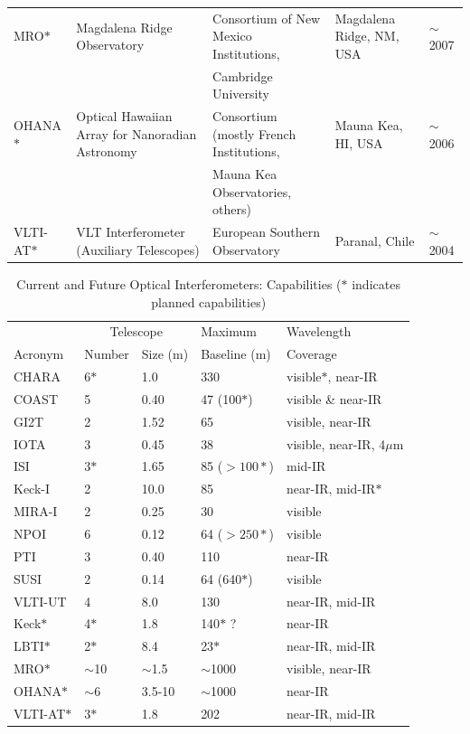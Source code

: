 \documentclass[12pt]{iopart}
\begin{document}
\begin{landscape}
\begin{table}
\begin{center}
\begin{tabular}{|l|l|l|l|l|}
MRO$\ast$ & Magdalena Ridge Observatory & Consortium of New Mexico Institutions, & Magdalena Ridge, NM, USA &
$\sim$2007 \\
&& Cambridge University & &\\
OHANA$\ast$ & Optical Hawaiian Array for Nanoradian Astronomy & Consortium (mostly French Institutions, &
Mauna Kea, HI, USA & $\sim$2006 \\
&& Mauna Kea Observatories, others) && \\
VLTI-AT$\ast$ & VLT Interferometer (Auxiliary Telescopes) & 
European Southern Observatory & Paranal, Chile & $\sim$2004 \\
\hline
\end{tabular}
\end{center}

\end{table}
\end{landscape}


\begin{table}
\footnotesize
\caption {Current and Future Optical Interferometers: Capabilities
($\ast$ indicates planned capabilities)
\label{table:capabilities}}
\begin{center}
\begin{tabular}{|l|l|l|l|l|}
\hline
\footnotesize
        &            \multicolumn{2}{|c|}{Telescope} & Maximum & Wavelength  \\
Acronym &  Number & Size (m) & Baseline (m) & Coverage \\ 
\hline
CHARA &  6$\ast$ & 1.0 & 330 & visible$\ast$,
near-IR \\
COAST &  5 & 0.40 & 47 (100$\ast$) & visible \& near-IR \\
GI2T &  2 & 1.52 & 65 & visible, near-IR \\
IOTA &  3 & 0.45 & 38 & visible, near-IR, 4$\mu$m \\
ISI &  3$\ast$ & 1.65 & 85 ($>100 \ast$) & mid-IR \\
Keck-I &  2 & 10.0 & 85 & near-IR, mid-IR$\ast$ \\
MIRA-I &  2 & 0.25 & 30 & visible \\
NPOI &  6 & 0.12 & 64 ($>250\ast$) & visible\\
PTI &  3 & 0.40 & 110 & near-IR \\
SUSI &  2 & 0.14 & 64 (640$\ast$) & visible \\
VLTI-UT &  4 & 8.0 & 130& near-IR, mid-IR \\
\hline
Keck$\ast$ &  4$\ast$ & 1.8 & 140$\ast$ ? & near-IR \\
LBTI$\ast$ &  2$\ast$ & 8.4 & 23$\ast$ & near-IR, mid-IR \\
MRO$\ast$ &  $\sim$10 & $\sim$1.5 & $\sim$1000 & visible, near-IR \\
OHANA$\ast$ & $\sim$6 & 3.5-10 & $\sim$1000 & near-IR \\
VLTI-AT$\ast$ &  3$\ast$ & 1.8 & 202 & near-IR, mid-IR \\
\hline
\end{tabular}
\end{center}
\end{table}
\end{document}
